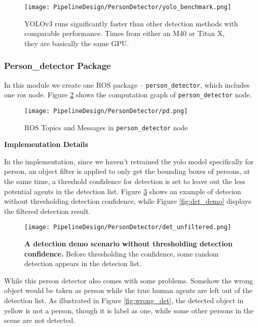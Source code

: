 \begin{figure}[H]
  \centering
  \texttt{[image: PipelineDesign/PersonDetector/yolo\_benchmark.png]}
  \caption{YOLOv3 runs significantly faster than other detection methods with comparable performance.
           Times from either an M40 or Titan X, they are basically the same GPU. 
           \cite{DBLP:journals/corr/RedmonDGF15}}
  \label{fig:yolo_benchmark}
\end{figure}

\subsubsection{Person\_detector Package}
In this module we create one ROS package -- \texttt{person\_detector}, which includes one ros node. Figure \ref{fig:pd} shows the computation graph of \texttt{person\_detector} node.

\begin{figure}[H]
  \centering
  \texttt{[image: PipelineDesign/PersonDetector/pd.png]}
  \caption{ROS Topics and Messages in \texttt{person\_detector} node}
  \label{fig:pd}
\end{figure} 

\textbf{Implementation Details}

In the implementation, since we haven't retrained the yolo model specifically for person, an object filter is applied to only get the bounding boxes of persons, at the same time, a threshold confidence for detection is set to leave out the less potential agents in the detection list. Figure \ref{fig:det_unfiltered} shows an example of detecion without thresholding detection confidence, while Figure \ref{fig:det_demo} displays the filtered detection result. 

\begin{figure}[h!]
  \centering
  \texttt{[image: PipelineDesign/PersonDetector/det\_unfiltered.png]}
  \caption{\textbf{A detection demo scenario without thresholding detection confidence.} Before
           thresholding the confidence, some random detection appears in the detecion list.}
  \label{fig:det_unfiltered}
\end{figure}

While this person detector also comes with some problems. Somehow the wrong object would be taken as person while the true human agents are left out of the detection list. As illustrated in Figure \ref{fig:wrong_det}, the detected object in yellow is not a person, though it is label as one, while some other persons in the scene are not detected.  

